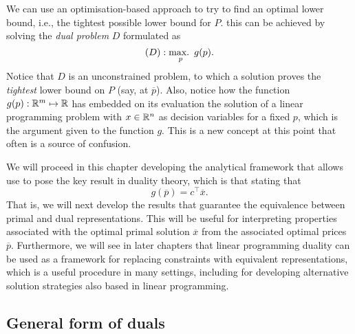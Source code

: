 We can use an optimisation-based approach to try to find an optimal lower bound, i.e., the tightest possible lower bound for $P$. this can be achieved by solving the \emph{dual problem} $D$ formulated as 
%
\begin{equation*}
	(D) : \mathop{\text{max.~}}_p g(p).
\end{equation*}
%
Notice that $D$ is an unconstrained problem, to which a solution proves the \emph{tightest} lower bound on $P$ (say, at $\overline{p}$). Also, notice how the function $g(p) : \mathbb{R}^m \mapsto \mathbb{R}$ has embedded on its evaluation the solution of a linear programming problem with $x \in \mathbb{R}^n$ as decision variables for a fixed $p$, which is the argument given to the function $g$. This is a new concept at this point that often is a source of confusion. 

We will proceed in this chapter developing the analytical framework that allows use to pose the key result in duality theory, which is that stating that 
%
\begin{equation*}
	g(\overline{p}) = c^\top \overline{x}.	
\end{equation*}
%
That is, we will next develop the results that guarantee the equivalence between primal and dual representations. This will be useful for interpreting properties associated with the optimal primal solution $\overline{x}$ from the associated optimal prices $\overline{p}$. Furthermore, we will see in later chapters that linear programming duality can be used as a framework for replacing constraints with equivalent representations, which is a useful procedure in many settings, including for developing alternative solution strategies also based in linear programming. 


\subsection{General form of duals}

